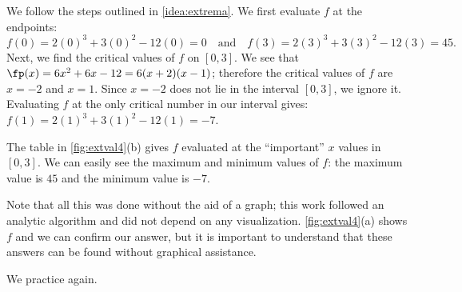 {We follow the steps outlined in \autoref{idea:extrema}. We first evaluate $f$ at the endpoints:
\[f(0)=2(0)^3+3(0)^2-12(0) = 0 \quad \text{and}\quad f(3)=2(3)^3+3(3)^2-12(3) =45.\]
Next, we find the critical values of $f$ on $[0,3]$. We see that $\fp(x) = 6x^2+6x-12 = 6(x+2)(x-1)$; therefore the critical values of $f$ are $x=-2$ and $x=1$. Since $x=-2$ does not lie in the interval $[0,3]$, we ignore it. Evaluating $f$ at the only critical number in our interval gives: $f(1)=2(1)^3+3(1)^2-12(1) = -7$. 


The table in \autoref{fig:extval4}(b) gives $f$ evaluated at the ``important'' $x$ values in $[0,3]$. We can easily see the maximum and minimum values of $f$: the maximum value is $45$ and the minimum value is $-7$.}

Note that all this was done without the aid of a graph; this work followed an analytic algorithm and did not depend on any visualization. \autoref{fig:extval4}(a) shows $f$ and we can confirm our answer, but it is important to  understand that these answers can be found without graphical assistance.

We practice again.

